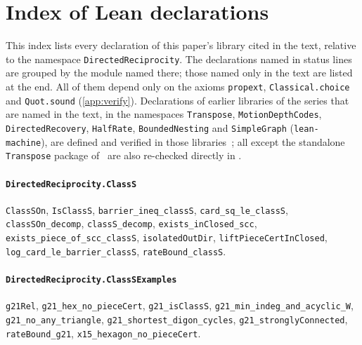 \section{Index of Lean declarations}\label{app:index}

This index lists every declaration of this paper's library cited in the text, relative to the namespace
\texttt{DirectedReciprocity}. The declarations named in status lines are grouped by the module named there; those named only
in the text are listed at the end. All of them depend only on the axioms \texttt{propext}, \texttt{Classical.choice} and
\texttt{Quot.sound} (\cref{app:verify}). Declarations of earlier libraries of the series that are named in the text,
in the namespaces \texttt{Transpose}, \texttt{MotionDepthCodes}, \texttt{DirectedRecovery}, \texttt{HalfRate},
\texttt{BoundedNesting} and \texttt{SimpleGraph} (\texttt{lean-machine}), are defined and verified in those
libraries~\cite{FirstPaper2026,FourthPaper2026,DirectedRecovery2026,SeventhPaper2026,EighthPaper2026}; all except the
standalone \texttt{Transpose} package of~\cite{FirstPaper2026} are also re-checked directly in .

\paragraph{\texttt{DirectedReciprocity.ClassS}}
{\small\raggedright \texttt{ClassSOn}, \texttt{IsClassS}, \texttt{barrier\_ineq\_classS}, \texttt{card\_sq\_le\_classS}, \texttt{classSOn\_decomp}, \texttt{classS\_decomp}, \texttt{exists\_inClosed\_scc}, \texttt{exists\_piece\_of\_scc\_classS}, \texttt{isolatedOutDir}, \texttt{liftPieceCertInClosed}, \texttt{log\_card\_le\_barrier\_classS}, \texttt{rateBound\_classS}.\par}

\paragraph{\texttt{DirectedReciprocity.ClassSExamples}}
{\small\raggedright \texttt{g21Rel}, \texttt{g21\_hex\_no\_pieceCert}, \texttt{g21\_isClassS}, \texttt{g21\_min\_indeg\_and\_acyclic\_W}, \texttt{g21\_no\_any\_triangle}, \texttt{g21\_shortest\_digon\_cycles}, \texttt{g21\_stronglyConnected}, \texttt{rateBound\_g21}, \texttt{x15\_hexagon\_no\_pieceCert}.\par}

